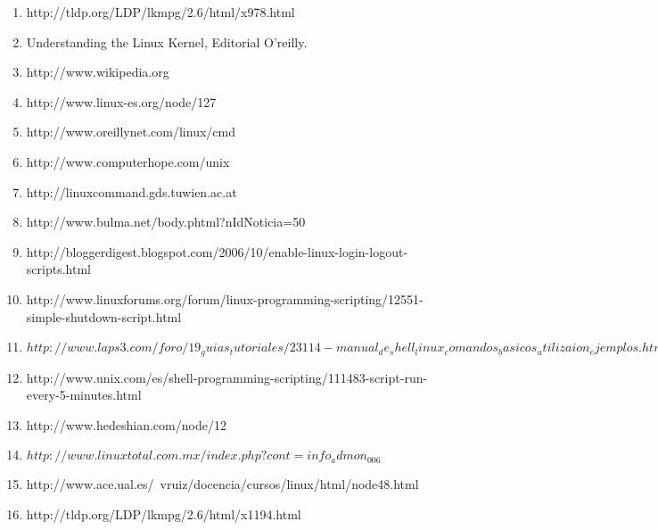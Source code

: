 \documentclass[a4paper, 12pt]{article}
\begin{document}
\begin{enumerate}
\item http://tldp.org/LDP/lkmpg/2.6/html/x978.html
\item Understanding the Linux Kernel, Editorial O'reilly.
\item http://www.wikipedia.org
\item http://www.linux-es.org/node/127 
\item http://www.oreillynet.com/linux/cmd 
\item http://www.computerhope.com/unix 
\item http://linuxcommand.gds.tuwien.ac.at 
\item http://www.bulma.net/body.phtml?nIdNoticia=50 
\item http://bloggerdigest.blogspot.com/2006/10/enable-linux-login-logout-scripts.html 
\item http://www.linuxforums.org/forum/linux-programming-scripting/12551-simple-shutdown-script.html 
\item $http://www.laps3.com/foro/19_guias_tutoriales/23114-manual_de_shell_linux_comandos_basicos_utilizaion_ejemplos.html $
\item http://www.unix.com/es/shell-programming-scripting/111483-script-run-every-5-minutes.html
\item http://www.hedeshian.com/node/12 
\item $http://www.linuxtotal.com.mx/index.php?cont=info_admon_006$
\item http://www.ace.ual.es/~vruiz/docencia/cursos/linux/html/node48.html 
\item http://tldp.org/LDP/lkmpg/2.6/html/x1194.html
\end{enumerate}
\end{document}
